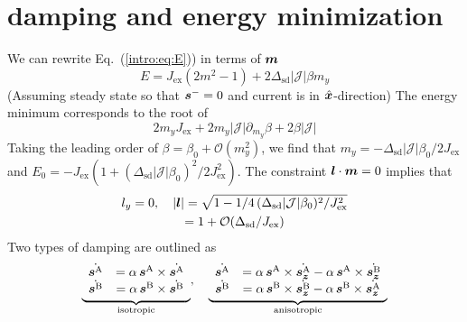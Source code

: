 \section{damping and energy minimization}
We can rewrite Eq.~(\ref{intro:eq:E})) in terms of $\boldsymbol{m}$
\begin{equation}
    E = J_\text{ex}(2m^2-1)+2\Delta_\text{sd}|\mathcal{J}|\beta m_y
\end{equation}
(Assuming steady state so that $\boldsymbol{s}^-=0$ and current is in $\hat{\boldsymbol{x}}$-direction)
The energy minimum corresponds to the root of 
\begin{equation}
    2m_yJ_\text{ex}+2m_y|\mathcal{J}|\partial_{m_y}\beta+2\beta|\mathcal{J}|
\end{equation}
Taking the leading order of $\beta=\beta_0 + \mathcal{O}(m_y^2)$, we find that $m_y=-\Delta_\text{sd}|\mathcal{J}|\beta_0/2J_\text{ex}$ and $E_0=-J_\text{ex}(1+(\Delta_\text{sd}|\mathcal{J}|\beta_0)^2/2J_\text{ex}^2)$. The constraint $\boldsymbol{l}\cdot\boldsymbol{m}=0$ implies that 
\begin{multline}
    l_y=0,\quad |\boldsymbol{l}| = \sqrt{1-1/4\,(\Delta_\text{sd}|\mathcal{J}|\beta_0)^2/J_\text{ex}^2} \\=1+\mathcal{O}(\Delta_\text{sd}/J_\text{ex})
\end{multline}
Two types of damping are outlined as
\begin{align}
\underbrace{
\begin{array}{cc}
    \dot{\boldsymbol{s}^\text{A}} &= \alpha\, \boldsymbol{s}^\text{A}\times\dot{\boldsymbol{s}^\text{A}} \\
    \dot{\boldsymbol{s}^\text{B}} &= \alpha\, \boldsymbol{s}^\text{B}\times\dot{\boldsymbol{s}^\text{B}}
\end{array}}_\text{isotropic}
,\quad
\underbrace{
\begin{array}{cc}
\dot{\boldsymbol{s}^\text{A}} &= \alpha\, \boldsymbol{s}^\text{A}\times\dot{\boldsymbol{s_z}^\text{A}}-\alpha\, \boldsymbol{s}^\text{A}\times\dot{\boldsymbol{s_z}^\text{B}} \\
    \dot{\boldsymbol{s}^\text{B}} &= \alpha\, \boldsymbol{s}^\text{B}\times\dot{\boldsymbol{s_z}^\text{B}}-\alpha\, \boldsymbol{s}^\text{B}\times\dot{\boldsymbol{s_z}^\text{A}}
\end{array}
}_\text{anisotropic}
\end{align}

